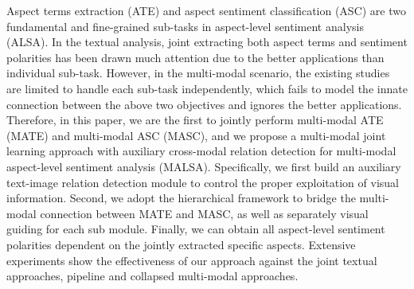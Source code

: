Aspect terms extraction (ATE) and aspect sentiment classification (ASC) are two fundamental and fine-grained sub-tasks in aspect-level sentiment analysis (ALSA). In the textual analysis, joint extracting both aspect terms and sentiment polarities has been drawn much attention due to the better applications than individual sub-task. However, in the multi-modal scenario, the existing studies are limited to handle each sub-task independently, which fails to model the innate connection between the above two objectives and ignores the better applications. Therefore, in this paper, we are the first to jointly perform multi-modal ATE (MATE) and multi-modal ASC (MASC), and we propose a multi-modal joint learning approach with auxiliary cross-modal relation detection for multi-modal aspect-level sentiment analysis (MALSA). Specifically, we first build an auxiliary text-image relation detection module to control the proper exploitation of visual information. Second, we adopt the hierarchical framework to bridge the multi-modal connection between MATE and MASC, as well as separately visual guiding for each sub module. Finally, we can obtain all aspect-level sentiment polarities dependent on the jointly extracted specific aspects. Extensive experiments show the effectiveness of our approach against the joint textual approaches, pipeline and collapsed multi-modal approaches.
